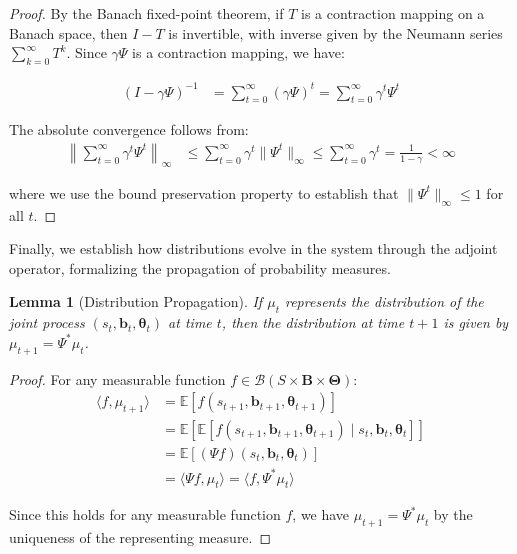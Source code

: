 \documentclass[a4paper,12pt]{report}
\newtheorem{lemma}{Lemma}
\begin{document}
\begin{proof}
    By the Banach fixed-point theorem, if $T$ is a contraction mapping on a Banach
    space, then $I - T$ is invertible, with inverse given by the Neumann series
    $\sum_{k=0}^{\infty}T^{k}$. Since $\gamma \Psi$ is a contraction mapping, we
    have:

    \begin{align}
        (I - \gamma \Psi)^{-1} & = \sum_{t=0}^{\infty}(\gamma \Psi)^{t} = \sum_{t=0}^{\infty}\gamma^{t} \Psi^{t}
    \end{align}

    The absolute convergence follows from:
    \begin{align}
        \left\|\sum_{t=0}^{\infty}\gamma^{t} \Psi^{t}\right\|_{\infty} & \leq \sum_{t=0}^{\infty}\gamma^{t} \|\Psi^{t}\|_{\infty}\leq \sum_{t=0}^{\infty}\gamma^{t} = \frac{1}{1-\gamma}< \infty
    \end{align}

    where we use the bound preservation property to establish that $\|\Psi^{t}\|_{\infty}
        \leq 1$ for all $t$.
\end{proof}

Finally, we establish how distributions evolve in the system through the adjoint
operator, formalizing the propagation of probability measures.

\begin{lemma}[Distribution Propagation]
    If $\mu_{t}$ represents the distribution of the joint process $(s_{t}, \boldsymbol
        {b}_{t}, \boldsymbol{\theta}_{t})$ at time $t$, then the distribution at time
    $t+1$ is given by $\mu_{t+1}= \Psi^{*}\mu_{t}$.
\end{lemma}

\begin{proof}
    For any measurable function $f \in \mathcal{B}(S \times \boldsymbol{B}\times \boldsymbol
        {\Theta})$:
    \begin{align}
        \langle f, \mu_{t+1}\rangle & = \mathbb{E}[f(s_{t+1}, \boldsymbol{b}_{t+1}, \boldsymbol{\theta}_{t+1})]                                                                     \\
                                    & = \mathbb{E}[\mathbb{E}[f(s_{t+1}, \boldsymbol{b}_{t+1}, \boldsymbol{\theta}_{t+1}) \mid s_{t}, \boldsymbol{b}_{t}, \boldsymbol{\theta}_{t}]] \\
                                    & = \mathbb{E}[(\Psi f)(s_{t}, \boldsymbol{b}_{t}, \boldsymbol{\theta}_{t})]                                                                    \\
                                    & = \langle \Psi f, \mu_{t} \rangle = \langle f, \Psi^{*}\mu_{t} \rangle
    \end{align}

    Since this holds for any measurable function $f$, we have
    $\mu_{t+1}= \Psi^{*}\mu_{t}$ by the uniqueness of the representing measure.
\end{proof}
\end{document}
